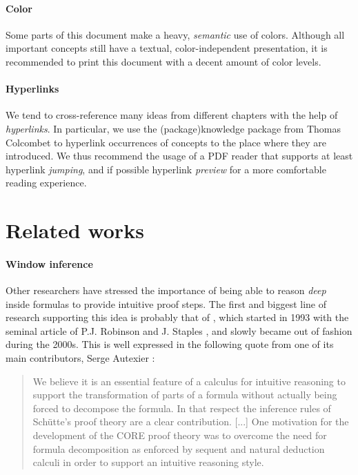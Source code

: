 \paragraph{Color}

Some parts of this document make a heavy, \emph{semantic} use of colors.
Although all important concepts still have a textual, color-independent
presentation, it is recommended to print this document with a decent amount of
color levels.

\paragraph{Hyperlinks}
  
We tend to cross-reference many ideas from different chapters with the help of
\emph{hyperlinks}. In particular, we use the \kl(package){knowledge} package
from Thomas Colcombet to hyperlink occurrences of concepts to the place where
they are introduced. We thus recommend the usage of a PDF reader that supports
at least hyperlink \emph{jumping}, and if possible hyperlink \emph{preview} for
a more comfortable reading experience.


\section{Related works}

\paragraph{Window inference}

\AP
Other researchers have stressed the importance of being able to reason
\emph{deep} inside formulas to provide intuitive proof steps. The first and
biggest line of research supporting this idea is probably that of , which started in 1993 with the seminal article of P.J. Robinson and
J. Staples , and slowly became out of
fashion during the 2000s. This is well expressed in the following quote from one
of its main contributors, Serge Autexier :

\begin{quote}
We believe it is an essential feature of a calculus for intuitive reasoning to
support the transformation of parts of a formula without actually being forced
to decompose the formula. In that respect the inference rules of Schütte's proof
theory are a clear contribution. [...] One motivation for the development of the
CORE proof theory was to overcome the need for formula decomposition as enforced
by sequent and natural deduction calculi in order to support an intuitive
reasoning style.
\end{quote}


